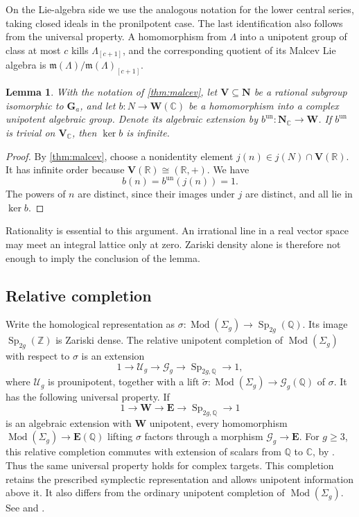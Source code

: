 \documentclass[11pt,a4paper]{article}
\newtheorem{lemma}[theorem]{Lemma}
\theoremstyle{definition}
\newcommand{\R}{\mathbb R}
\newcommand{\Q}{\mathbb Q}
\newcommand{\Z}{\mathbb Z}
\newcommand{\C}{\mathbb C}
\newcommand{\Mod}{\operatorname{Mod}}
\newcommand{\Sp}{\operatorname{Sp}}
\newcommand{\Ga}{\mathbf G_a}
\newcommand{\un}{\mathrm{un}}
\begin{document}
On the Lie-algebra side we use the analogous notation for the lower
central series, taking closed ideals in the pronilpotent case.
The last identification also follows from the universal property.
A homomorphism from \(\Lambda\) into a unipotent group of class at
most \(c\) kills \(\Lambda_{[c+1]}\), and the corresponding
quotient of its Malcev Lie algebra is
\(\mathfrak m(\Lambda)/\mathfrak m(\Lambda)_{[c+1]}\).

\begin{lemma}\label{lem:rationalkernel}
With the notation of \cref{thm:malcev}, let
\(\mathbf V\subseteq\mathbf N\) be a rational subgroup isomorphic to
\(\Ga\), and let \(b:N\to\mathbf W(\C)\) be a homomorphism
into a complex unipotent algebraic group. Denote its algebraic
extension by \(b^{\un}:\mathbf N_{\C}\to\mathbf W\).
If \(b^{\un}\) is trivial on \(\mathbf V_{\C}\), then
\(\ker b\) is infinite.
\end{lemma}
\begin{proof}
By \cref{thm:malcev}, choose a nonidentity element
\(j(n)\in j(N)\cap\mathbf V(\R)\). It has infinite order because
\(\mathbf V(\R)\cong(\R,+)\). We have
\[
 b(n)=b^{\un}(j(n))=1.
\]
The powers of \(n\) are distinct, since their images under \(j\)
are distinct, and all lie in \(\ker b\).
\end{proof}

Rationality is essential to this argument. An irrational line in a
real vector space may meet an integral lattice only at zero. Zariski
density alone is therefore not enough to imply the conclusion of the lemma.

\subsection{Relative completion}

Write the homological representation as \(\sigma:\Mod(\Sigma_g)\to\Sp_{2g}(\Q)\). Its image
\(\Sp_{2g}(\Z)\) is Zariski dense. The relative unipotent completion
of \(\Mod(\Sigma_g)\) with respect to \(\sigma\) is an extension
\[
 1\longrightarrow\mathcal U_g\longrightarrow\mathcal G_g
 \longrightarrow\Sp_{2g,\Q}\longrightarrow1,
\]
where \(\mathcal U_g\) is prounipotent, together with a lift
\(\widetilde\sigma:\Mod(\Sigma_g)\to\mathcal G_g(\Q)\) of \(\sigma\).
It has the following universal property. If
\[
 1\longrightarrow\mathbf W\longrightarrow\mathbf E
 \longrightarrow\Sp_{2g,\Q}\longrightarrow1
\]
is an algebraic extension with \(\mathbf W\) unipotent, every
homomorphism \(\Mod(\Sigma_g)\to\mathbf E(\Q)\) lifting \(\sigma\) factors
through a morphism \(\mathcal G_g\to\mathbf E\). For \(g\ge3\),
this relative completion commutes with extension of scalars from
\(\Q\) to \(\C\), by \cite[Theorem~3.1]{Hain}. Thus the
same universal property holds for complex targets. This
completion retains the prescribed symplectic representation and allows
unipotent information above it. It also differs from the ordinary unipotent
completion of \(\Mod(\Sigma_g)\). See \cite[Section~3]{Hain} and
\cite[Section~4]{HainMatsumoto}. 
\end{document}
